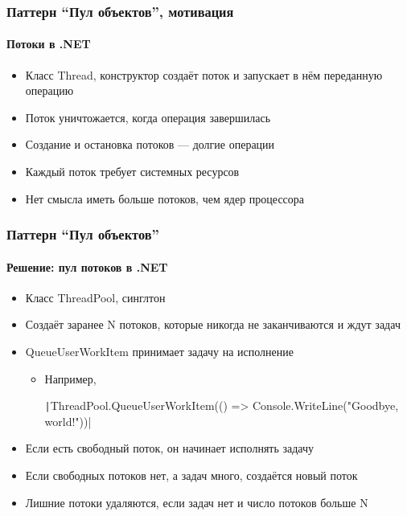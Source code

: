 \documentclass{../../slides-style}
\begin{document}
    \begin{frame}
        \frametitle{Паттерн ``Пул объектов'', мотивация}
        \framesubtitle{Потоки в .NET}
        \begin{itemize}
            \item Класс Thread, конструктор создаёт поток и запускает в нём переданную операцию
            \item Поток уничтожается, когда операция завершилась
            \item Создание и остановка потоков --- долгие операции
            \item Каждый поток требует системных ресурсов
            \item Нет смысла иметь больше потоков, чем ядер процессора
        \end{itemize}
    \end{frame}

    \begin{frame}
        \frametitle{Паттерн ``Пул объектов''}
        \framesubtitle{Решение: пул потоков в .NET}
        \begin{itemize}
            \item Класс ThreadPool, синглтон
            \item Создаёт заранее N потоков, которые никогда не заканчиваются и ждут задач
            \item QueueUserWorkItem принимает задачу на исполнение
            \begin{itemize}
                \item Например, 
                \begin{footnotesize}
                    \texttt|ThreadPool.QueueUserWorkItem(() => Console.WriteLine("Goodbye, world!"))|
                \end{footnotesize}
            \end{itemize}
            \item Если есть свободный поток, он начинает исполнять задачу
            \item Если свободных потоков нет, а задач много, создаётся новый поток
            \item Лишние потоки удаляются, если задач нет и число потоков больше N
        \end{itemize}
    \end{frame}
\end{document}
